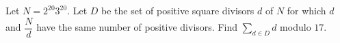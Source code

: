 Let $N=2^{20}3^{20}$. Let $D$ be the set of positive square divisors $d$ of $N$ for which $d$ and $\dfrac{N}{d}$ have the same number of positive divisors. Find $\sum_{d\in D}d$ modulo $17$.
